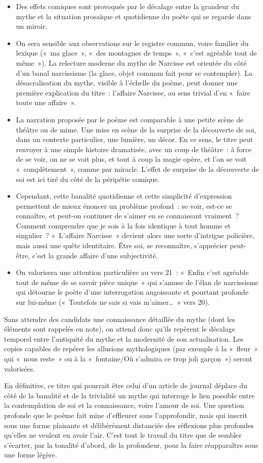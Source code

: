 {\begin{itemize}
\item Des effets comiques sont provoqués par le décalage entre la grandeur du mythe
et la situation prosaïque et quotidienne du poète qui se regarde dans un miroir.
\item On sera sensible aux observations sur le registre commun, voire familier du
lexique («~ma glace~», «~des montagnes de temps~», «~c'est agréable tout de
même~»). La relecture moderne du mythe de Narcisse est orientée du côté d'un
banal narcissisme (la glace, objet commun fait pour se contempler). La
désacralisation du mythe, visible à l'échelle du poème, peut donner une
première explication du titre~: l'affaire Narcisse, au sens trivial d'en «~faire toute
une affaire~».
\item La narration proposée par le poème est comparable à une petite scène de
théâtre ou de mime. Une mise en scène de la surprise de la découverte de soi,
dans un contexte particulier, une lumière, un décor. En ce sens, le titre peut
renvoyer à une simple histoire dramatisée, avec un coup de théâtre~: à force de
se voir, on ne se voit plus, et tout à coup la magie opère, et l'on se voit
«~complètement~», comme par miracle. L'effet de surprise de la découverte de
soi est ici tiré du côté de la péripétie comique.
\item Cependant, cette banalité quotidienne et cette simplicité d'expression
permettent de mieux énoncer un problème profond~: se voir, est-ce se
connaître, et peut-on continuer de s'aimer en se connaissant vraiment~?
Comment comprendre que je sois à la fois identique à tout homme et singulier~?
«~L'affaire Narcisse~» devient alors une sorte d'intrigue policière, mais aussi une
quête identitaire. Être soi, se reconnaître, s'apprécier peut-être, c'est la grande
affaire d'une subjectivité.
\item On valorisera une attention particulière au vers 21~: «~Enfin c'est agréable tout
de même de se savoir pièce unique~» qui s'amuse de l'élan de narcissisme qui
détourne le poète d'une interrogation angoissante et pourtant profonde sur lui-même («~Toutefois ne sais si vais m'aimer…~» vers 20).
\end{itemize}

Sans attendre des candidats une connaissance détaillée du mythe (dont les
éléments sont rappelés en note), on attend donc qu'ils repèrent le décalage temporel
entre l'antiquité du mythe et la modernité de son actualisation. Les copies capables de
repérer les allusions mythologiques (par exemple à la «~fleur~» qui «~nous reste~» ou à
la «~fontaine/Où s'admira ce trop joli garçon~») seront valorisées.

En définitive, ce titre qui pourrait être celui d'un article de journal déplace du côté
de la banalité et de la trivialité un mythe qui interroge le lien possible entre la
contemplation de soi et la connaissance, voire l'amour de soi. Une question profonde
que le poème fait mine d'effleurer sans l'approfondir, mais qui inscrit sous une forme
plaisante et délibérément distanciée des réflexions plus profondes qu'elles ne veulent
en avoir l'air. C'est tout le travail du titre que de sembler s'écarter, par la tonalité
d'abord, de la profondeur, pour la faire réapparaître sous une forme légère.}%
